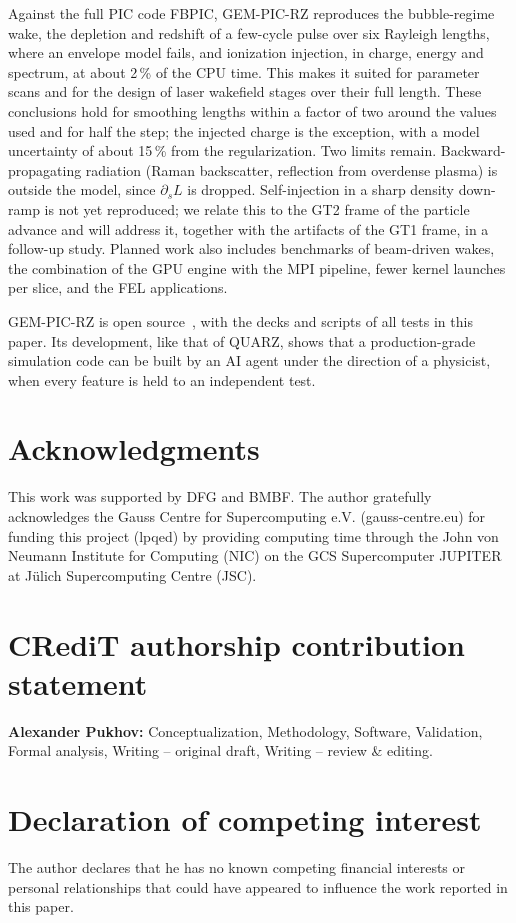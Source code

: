 \documentclass[preprint,12pt]{elsarticle}
\begin{document}
Against the full PIC code FBPIC, GEM-PIC-RZ reproduces the bubble-regime wake, the depletion and redshift of a few-cycle pulse over six Rayleigh lengths, where an envelope model fails, and ionization injection, in charge, energy and spectrum, at about 2\,\% of the CPU time. This makes it suited for parameter scans and for the design of laser wakefield stages over their full length. These conclusions hold for smoothing lengths within a factor of two around the values used and for half the step; the injected charge is the exception, with a model uncertainty of about 15\,\% from the regularization. Two limits remain. Backward-propagating radiation (Raman backscatter, reflection from overdense plasma) is outside the model, since $\partial_s L$ is dropped. Self-injection in a sharp density down-ramp is not yet reproduced; we relate this to the GT2 frame of the particle advance and will address it, together with the artifacts of the GT1 frame, in a follow-up study. Planned work also includes benchmarks of beam-driven wakes, the combination of the GPU engine with the MPI pipeline, fewer kernel launches per slice, and the FEL applications.

GEM-PIC-RZ is open source~\cite{GEMPICRZ}, with the decks and scripts of all tests in this paper. Its development, like that of QUARZ, shows that a production-grade simulation code can be built by an AI agent under the direction of a physicist, when every feature is held to an independent test.

\section*{Acknowledgments}
This work was supported by DFG and BMBF. The author gratefully acknowledges the Gauss Centre for Supercomputing e.V. (gauss-centre.eu) for funding this project (lpqed) by providing computing time through the John von Neumann Institute for Computing (NIC) on the GCS Supercomputer JUPITER at J\"ulich Supercomputing Centre (JSC).

\section*{CRediT authorship contribution statement}
\textbf{Alexander Pukhov:} Conceptualization, Methodology, Software, Validation, Formal analysis, Writing -- original draft, Writing -- review \& editing.

\section*{Declaration of competing interest}
The author declares that he has no known competing financial interests or personal relationships that could have appeared to influence the work reported in this paper.
\end{document}
